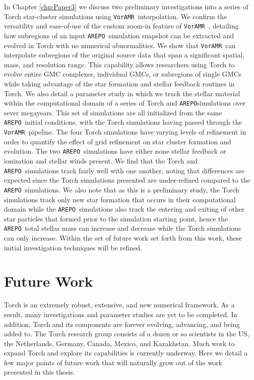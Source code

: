 \documentclass[twoside]{drexel-thesis}
\newcommand\voramr{\texttt{VorAMR}}
\newcommand\arepo{\texttt{AREPO}}
\begin{document}
\begin{thesis}
In Chapter \ref{chp:Paper3} we discuss two preliminary investigations into a series of Torch star-cluster simulations using \voramr~interpolation. We confirm the versatility and ease-of-use of the custom zoom-in feature of \voramr~, detailing how subregions of an input \arepo~simulation snapshot can be extracted and evolved in Torch with no numerical abnormalities. We show that \voramr~can interpolate subregions of the original source data that span a significant spatial, mass, and resolution range. This capability allows researchers using Torch to evolve entire GMC complexes, individual GMCs, or subregions of single GMCs while taking advantage of the star formation and stellar feedback routines in Torch. We also detail a parameter study in which we track the stellar material within the computational domain of a series of Torch and \arepo simulations over sever megayears. This set of simulations are all initialized from the same \arepo~initial conditions, with the Torch simulations having passed through the \voramr~pipeline. The four Torch simulations have varying levels of refinement in order to quantify the effect of grid refinement on star cluster formation and evolution. The two \arepo~simulations have either none stellar feedback or ionization and stellar winds present. We find that the Torch and \arepo~simulations track fairly well with one another, noting that differences are expected since the Torch simulations presented are under-refined compared to the \arepo~simulations. We also note that as this is a preliminary study, the Torch simulations track only new star formation that occurs in their computational domain while the \arepo~simulations also track the entering and exiting of other star particles that formed prior to the simulation starting point, hence the \arepo~total stellar mass can increase and decrease while the Torch simulations can only increase. Within the set of future work set forth from this work, these initial investigation techniques will be refined.


\section{Future Work}
Torch is an extremely robust, extensive, and new numerical framework. As a result, many investigations and parameter studies are yet to be completed. In addition, Torch and its components are forever evolving, advancing, and being added to. The Torch research group consists of a dozen or so scientists in the US, the Netherlands, Germany, Canada, Mexico, and Kazakhstan. Much work to expand Torch and explore its capabilities is currently underway. Here we detail a few major points of future work that will naturally grow out of the work presented in this thesis.


\end{thesis}
\end{document}

